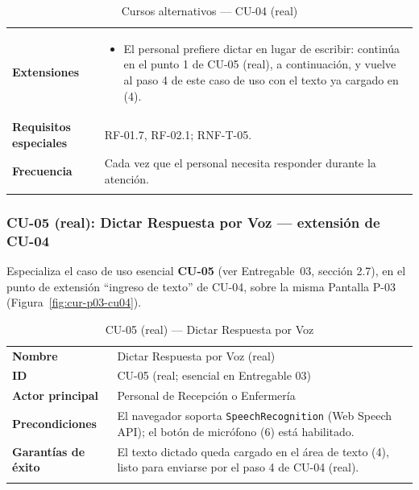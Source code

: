 \begin{longtable}{@{}p{4.1cm} >{\raggedright\arraybackslash}p{11.2cm}@{}}
\toprule
\textbf{Extensiones} &
\begin{itemize}[leftmargin=*, itemsep=2pt]
    \item[2a.] El personal prefiere dictar en lugar de escribir:
    continúa en el punto 1 de CU-05 (real), a continuación, y vuelve al
    paso 4 de este caso de uso con el texto ya cargado en (4).
\end{itemize} \\
\textbf{Requisitos especiales} & RF-01.7, RF-02.1; RNF-T-05. \\
\textbf{Frecuencia} &
Cada vez que el personal necesita responder durante la atención. \\
\bottomrule
\caption{Cursos alternativos --- CU-04 (real)}
\end{longtable}

\subsubsection*{CU-05 (real): Dictar Respuesta por Voz --- extensión de CU-04}

Especializa el caso de uso esencial \textbf{CU-05} (ver Entregable~03,
sección 2.7), en el punto de extensión ``ingreso de texto'' de CU-04, sobre
la misma Pantalla P-03 (Figura~\ref{fig:cur-p03-cu04}).

\begin{longtable}{@{}p{4.1cm} >{\raggedright\arraybackslash}p{11.2cm}@{}}
\toprule
\textbf{Nombre} & Dictar Respuesta por Voz (real) \\
\textbf{ID} & CU-05 (real; esencial en Entregable 03) \\
\textbf{Actor principal} & Personal de Recepción o Enfermería \\
\textbf{Precondiciones} &
El navegador soporta \texttt{SpeechRecognition} (Web Speech API); el
botón de micrófono (6) está habilitado. \\
\textbf{Garantías de éxito} &
El texto dictado queda cargado en el área de texto (4), listo para
enviarse por el paso 4 de CU-04 (real). \\
\bottomrule
\caption{CU-05 (real) — Dictar Respuesta por Voz}
\end{longtable}

